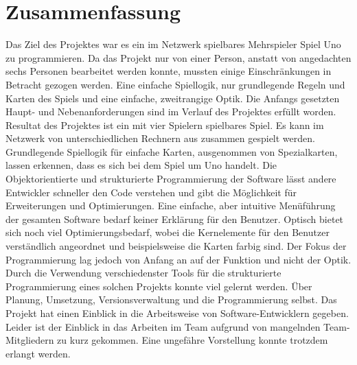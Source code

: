 
\chapter{Zusammenfassung}
Das Ziel des Projektes war es ein im Netzwerk spielbares Mehrspieler Spiel Uno zu programmieren. Da das Projekt nur von einer Person, anstatt von angedachten sechs Personen bearbeitet werden konnte, mussten einige Einschränkungen in Betracht gezogen werden. Eine einfache Spiellogik, nur grundlegende Regeln und Karten des Spiels und eine einfache, zweitrangige Optik. Die Anfangs gesetzten Haupt- und Nebenanforderungen sind im Verlauf des Projektes erfüllt worden. Resultat des Projektes ist ein mit vier Spielern spielbares Spiel. Es kann im Netzwerk von unterschiedlichen Rechnern aus zusammen gespielt werden. Grundlegende Spiellogik für einfache Karten, ausgenommen von Spezialkarten, lassen erkennen, dass es sich bei dem Spiel um Uno handelt. Die Objektorientierte und strukturierte Programmierung der Software lässt andere Entwickler schneller den Code verstehen und gibt die Möglichkeit für Erweiterungen und Optimierungen. Eine einfache, aber intuitive Menüführung der gesamten Software bedarf keiner Erklärung für den Benutzer. Optisch bietet sich noch viel Optimierungsbedarf, wobei die Kernelemente für den Benutzer verständlich angeordnet und beispielsweise die Karten farbig sind. Der Fokus der Programmierung lag jedoch von Anfang an auf der Funktion und nicht der Optik.\\
Durch die Verwendung verschiedenster Tools für die strukturierte Programmierung eines solchen Projekts konnte viel gelernt werden. Über Planung, Umsetzung, Versionsverwaltung und die Programmierung selbst. Das Projekt hat einen Einblick in die Arbeitsweise von Software-Entwicklern gegeben. Leider ist der Einblick in das Arbeiten im Team aufgrund von mangelnden Team-Mitgliedern zu kurz gekommen. Eine ungefähre Vorstellung konnte trotzdem erlangt werden.